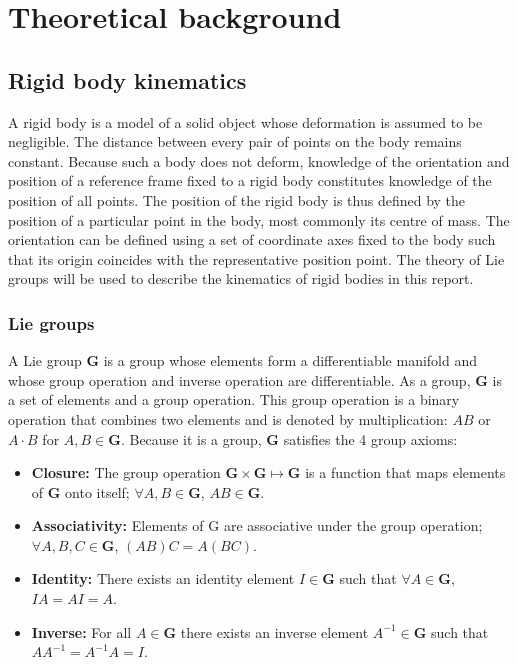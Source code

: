 \chapter{Theoretical background}\label{chap:background}

\section{Rigid body kinematics}
	A rigid body is a model of a solid object whose deformation is assumed to be negligible. The distance between every pair of points on the body remains constant. Because such a body does not deform, knowledge of the orientation and position of a reference frame fixed to a rigid body constitutes knowledge of the position of all points. The position of the rigid body is thus defined by the position of a particular point in the body, most commonly its centre of mass. The orientation can be defined using a set of coordinate axes fixed to the body such that its origin coincides with the representative position point.
	The theory of Lie groups will be used to describe the kinematics of rigid bodies in this report.
			
	\subsection{Lie groups}		
		A Lie group $\mathbf{G}$ is a group whose elements form a differentiable manifold and whose group operation and inverse operation are differentiable.
		As a group, $\mathbf{G}$ is a set of elements and a group operation. This group operation is a binary operation that combines two elements and is denoted by multiplication: $AB$ or $A \cdot B$ for $A,B \in \mathbf{G}$. Because it is a group, $\mathbf{G}$ satisfies the 4 group axioms:
		\begin{itemize}
		\item \textbf{Closure:} 
			The group operation
			$\mathbf{G} \times \mathbf{G} \mapsto \mathbf{G}$ 
			is a function that maps elements of $\mathbf{G}$ onto itself;
			$\forall A,B \in \mathbf{G}$, $AB \in \mathbf{G}$.
		\item \textbf{Associativity:} Elements of G are associative under the group operation;
			$\forall A,B,C \in \mathbf{G}$, $(AB)C=A(BC)$.
		\item \textbf{Identity:} There exists an identity element $I \in \mathbf{G}$  such that
			$\forall A \in \mathbf{G}$, $IA = AI = A$.
		\item \textbf{Inverse:} For all $A \in \mathbf{G}$ there exists an inverse element $A^{-1} \in \mathbf{G}$ such that $AA^{-1}=A^{-1}A=I$. 
		\end{itemize}
		

